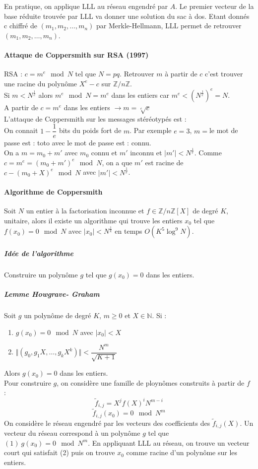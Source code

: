 \documentclass[12pt,a4paper]{report}
\begin{document}
En pratique, on applique LLL au réseau engendré par $A$. Le premier vecteur de la base réduite trouvée par LLL va donner une solution du sac à dos. Etant donnés c chiffré de $(m_1,m_2,\ldots,m_n)$ par Merkle-Hellmann, LLL permet de retrouver $(m_1,m_2,\ldots,m_n)$.
\paragraph{Attaque de Coppersmith sur RSA (1997)\\}
RSA : $c=m^e \mod N$ tel que $N=pq$. Retrouver $m$ à partir de $c$ c'est trouver une racine du polyn\^ome $X^e -c$ sur $\mathbb{Z}/n\mathbb{Z}$.\\
Si $m < N^{\frac{1}{e}}$ alors $m^e \mod N = m^e$ dans les entiers car $m^e < \left( N^{\frac{1}{e}}\right)^e = N$.\\
A partir de $c = m^e$ dans les entiers $\rightarrow m=\sqrt[e]{c}$\\

L'attaque de Coppersmith sur les messages stéréotypés est :\\
On connait $1-\dfrac{1}{e}$ bits du poids fort de $m$. Par exemple $e=3$, $m=$\og le mot de passe est : toto \fg avec \og le mot de passe est : \fg connu.\\
On a $ m = m_0 + m'$ avec $m_0$ connu et $m'$ inconnu et $\mid m' \mid < N^{\frac{1}{e}}$. Comme  $c=m^e = (m_0+m')^e \mod N$, on a que $m'$ est racine de $c - (m_0 + X)^e \mod N$ avec $\mid m' \mid < N^{\frac{1}{e}}$.
\paragraph{Algorithme de Coppersmith\\}
Soit $N$ un entier à la factorisation inconnue et $f \in \mathbb{Z}/n\mathbb{Z}[X]$ de degré $K$, unitaire, alors il existe un algorithme qui trouve les entiers $x_0$ tel que $f(x_0) = 0 \mod N$ avec $\mid x_0 \mid < N^{\frac{1}{k}}$ en temps $O(K^5\log^9 N)$.
\subparagraph{Idée de l'algorithme} Construire un polynôme $g$ tel que $g(x_0) = 0$ dans les entiers.
\subparagraph{Lemme Howgrave- Graham\\}
Soit $g$ un polynôme de degré $K$, $m \geqslant 0$ et $ X \in \mathbb{N}$. Si :
\begin{enumerate}
\item $g(x_0) = 0 \mod N$ avec $ \mid x_0 \mid < X$
\item $ \Vert (g_0,g_1X,\ldots,g_kX^k)\Vert < \dfrac{N^m}{\sqrt{K+1}} $
\end{enumerate}
Alors $g(x_0) = 0 $ dans les entiers.\\
Pour construire $g$, on considère une famille de ploynômes construits à partir de $f$ :
$$ \tilde{f}_{i,j} = X^j f(X)^i N^{m-i} $$
$$ \tilde{f}_{i,j}(x_0) = 0 \mod N^m $$
On considère le réseau engendré par les vecteurs des coefficients des $\tilde{f}_{i,j}(X)$. Un vecteur du réseau correspond à un polyn\^ome $g$ tel que $(1) \ g(x_0) = 0 \mod N^m $. En appliquant LLL au réseau, on trouve un vecteur court qui satisfait (2) puis on trouve $x_0$ comme racine d'un polynôme sur les entiers.
\end{document}
